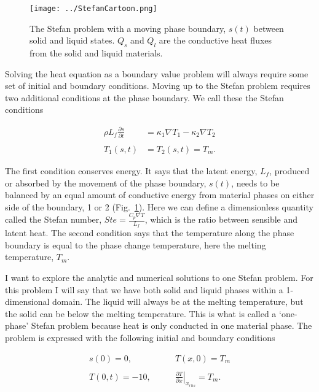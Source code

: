 \documentclass[12pt]{article}
\begin{document}
\begin{figure}[]
\centering
\texttt{[image: ../StefanCartoon.png]}
\caption{The Stefan problem with a moving phase boundary, $s(t)$ between solid and liquid states. $Q_s$ and $Q_l$ are the conductive heat fluxes from the solid and liquid materials.}
\label{StIllustration}
\end{figure}

Solving the heat equation as a boundary value problem will always require some set of initial and boundary conditions. Moving up to the Stefan problem requires two additional conditions at the phase boundary. We call these the Stefan conditions

\begin{equation}\label{eq:StCond}
\begin{aligned}
\rho L_f \frac{\partial s}{\partial t} &= \kappa_1 \nabla T_1 - \kappa_2 \nabla T_2 \\~\\
T_1(s,t) &= T_2(s,t) = T_m.
\end{aligned}
\end{equation}

The first condition conserves energy. It says that the latent energy, $L_f$, produced or absorbed by the movement of the phase boundary, $s(t)$, needs to be balanced by an equal amount of conductive energy from material phases on either side of the boundary, 1 or 2 (Fig.~\ref{StIllustration}). Here we can define a dimensionless quantity called the Stefan number, $Ste = \frac{C_p \nabla T}{L_f}$, which is the ratio between sensible and latent heat. The second condition says that the temperature along the phase boundary is equal to the phase change temperature, here the melting temperature, $T_m$. 

I want to explore the analytic and numerical solutions to one Stefan problem. For this problem I will say that we have both solid and liquid phases within a 1-dimensional domain. The liquid will always be at the melting temperature, but the solid can be below the melting temperature. This is what is called a `one-phase' Stefan problem because heat is only conducted in one material phase. The problem is expressed with the following initial and boundary conditions

\begin{equation}\label{eq:BCs}
\begin{aligned}
s(0) = 0,& \hspace{2em} T(x,0) = T_m \\~\\  
T(0,t) = -10,& \hspace{2em} \left. \frac{\partial T}{\partial x} \right| _{x_{rhs}} = T_m.
\end{aligned}
\end{equation}
\end{document}
